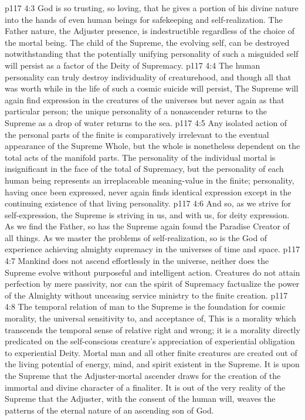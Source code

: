 \vs p117 4:3 God is so trusting, so loving, that he gives a portion of his divine nature into the hands of even human beings for safekeeping and self\hyp{}realization. The Father nature, the Adjuster presence, is indestructible regardless of the choice of the mortal being. The child of the Supreme, the evolving self, can be destroyed notwithstanding that the potentially unifying personality of such a misguided self will persist as a factor of the Deity of Supremacy.
\vs p117 4:4 The human personality can truly destroy individuality of creaturehood, and though all that was worth while in the life of such a cosmic suicide will persist,  The Supreme will again find expression in the creatures of the universes but never again as that particular person; the unique personality of a nonascender returns to the Supreme as a drop of water returns to the sea.
\vs p117 4:5 Any isolated action of the personal parts of the finite is comparatively irrelevant to the eventual appearance of the Supreme Whole, but the whole is nonetheless dependent on the total acts of the manifold parts. The personality of the individual mortal is insignificant in the face of the total of Supremacy, but the personality of each human being represents an irreplaceable meaning\hyp{}value in the finite; personality, having once been expressed, never again finds identical expression except in the continuing existence of that living personality.
\vs p117 4:6 And so, as we strive for self\hyp{}expression, the Supreme is striving in us, and with us, for deity expression. As we find the Father, so has the Supreme again found the Paradise Creator of all things. As we master the problems of self\hyp{}realization, so is the God of experience achieving almighty supremacy in the universes of time and space.
\pc \vs p117 4:7 Mankind does not ascend effortlessly in the universe, neither does the Supreme evolve without purposeful and intelligent action. Creatures do not attain perfection by mere passivity, nor can the spirit of Supremacy factualize the power of the Almighty without unceasing service ministry to the finite creation.
\vs p117 4:8 The temporal relation of man to the Supreme is the foundation for cosmic morality, the universal sensitivity to, and acceptance of,  This is a morality which transcends the temporal sense of relative right and wrong; it is a morality directly predicated on the self\hyp{}conscious creature’s appreciation of experiential obligation to experiential Deity. Mortal man and all other finite creatures are created out of the living potential of energy, mind, and spirit existent in the Supreme. It is upon the Supreme that the Adjuster\hyp{}mortal ascender draws for the creation of the immortal and divine character of a finaliter. It is out of the very reality of the Supreme that the Adjuster, with the consent of the human will, weaves the patterns of the eternal nature of an ascending son of God.
